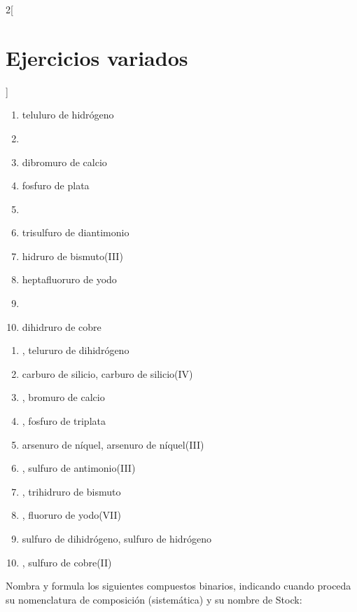 \documentclass[10pt]{article}
\begin{document}
\begin{multicols*}{2}[
  \section{Ejercicios variados}
  ]
\begin{exercise}[
    tags    = {inorgánica,compuestos binarios,sales binarias,sales},
    topics  = {química inorgánica,formulación,nomenclatura},
    source  = {SAN Formulación, p26, e30},
  ]
  \begin{enumerate}
    \item teluluro de hidrógeno
    \item {}
    \item dibromuro de calcio
    \item fosfuro de plata
    \item {}
    \item trisulfuro de diantimonio
    \item hidruro de bismuto(III)
    \item heptafluoruro de yodo
    \item {}
    \item dihidruro de cobre
  \end{enumerate}
\end{exercise}

\begin{solution}
  \begin{enumerate}
    \item {}, telururo de dihidrógeno
    \item carburo de silicio, carburo de silicio(IV)
    \item {}, bromuro de calcio
    \item {}, fosfuro de triplata
    \item arsenuro de níquel, arsenuro de níquel(III)
    \item {}, sulfuro de antimonio(III)
    \item {}, trihidruro de bismuto
    \item {}, fluoruro de yodo(VII)
    \item sulfuro de dihidrógeno, sulfuro de hidrógeno
    \item {}, sulfuro de cobre(II)
  \end{enumerate}
\end{solution}




\begin{exercise}[
    tags    = {inorgánica,compuestos binarios,óxidos,peróxidos},
    topics  = {química inorgánica,formulación,nomenclatura},
    source  = {SAN Formulación, p27, e31},
  ]
  Nombra y formula los siguientes compuestos binarios, indicando cuando proceda su nomenclatura de composición (sistemática) y su nombre de Stock:


\end{exercise}
\end{multicols*}
\end{document}

